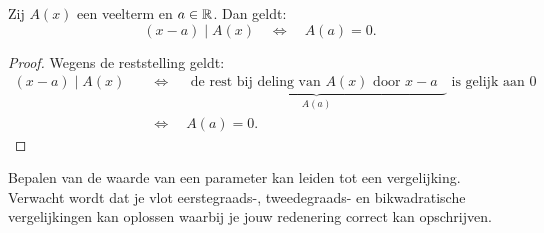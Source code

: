 \documentclass{ximera}
\begin{document}
\begin{theorem} 
Zij $A(x)$ een veelterm en $a \in \mathbb{R}$. Dan geldt:
\[
(x-a) \mid A(x) \quad \Leftrightarrow \quad A(a) = 0.
\]
\end{theorem} 


\begin{proof}

Wegens de reststelling geldt:
\begin{align}
(x-a) \mid A(x) \quad 
& \Leftrightarrow \quad \underbrace{\text{ de rest bij deling van $A(x)$ door $x-a$ }}_{A(a)} \text{ is gelijk aan $0$} \nonumber \\
& \Leftrightarrow \quad A(a) = 0. \tag*{\qedhere}
\end{align}

\end{proof}


Bepalen van de waarde van een parameter kan leiden tot een vergelijking. Verwacht wordt dat je vlot eerstegraads-, tweedegraads- en bikwadratische vergelijkingen kan oplossen waarbij je jouw redenering correct kan opschrijven. 
\end{document}
